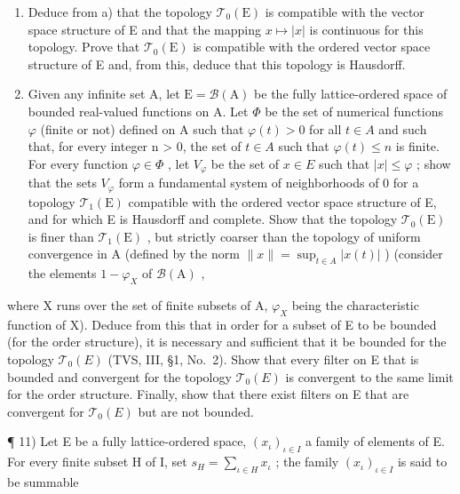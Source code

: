 \begin{enumerate}
\def\labelenumi{\alph{enumi})}
\setcounter{enumi}{1}
\item
  Deduce from a) that the topology \(\mathcal{T}_{0}(\mathrm{E})\) is compatible with the vector space structure of E and that the mapping \(x \mapsto |x|\) is continuous for this topology. Prove that \(\mathcal{T}_{0}(\mathrm{E})\) is compatible with the ordered vector space structure of E and, from this, deduce that this topology is Hausdorff.
\item
  Given any infinite set A, let \(\mathrm{E} = \mathcal{B}(\mathrm{A})\) be the fully lattice-ordered space of bounded real-valued functions on A. Let \(\Phi\) be the set of numerical functions \(\varphi\) (finite or not) defined on A such that \(\varphi(t) > 0\) for all \(t \in A\) and such that, for every integer n \textgreater{} 0, the set of \(t \in A\) such that \(\varphi(t) \leqslant n\) is finite. For every function \(\varphi \in \Phi\) , let \(V_{\varphi}\) be the set of \(x \in E\) such that \(|x| \leqslant \varphi\) ; show that the sets \(V_{\varphi}\) form a fundamental system of neighborhoods of 0 for a topology \(\mathcal{T}_{1}(\mathrm{E})\) compatible with the ordered vector space structure of E, and for which E is Hausdorff and complete. Show that the topology \(\mathcal{T}_{0}(\mathrm{E})\) is finer than \(\mathcal{T}_{1}(\mathrm{E})\) , but strictly coarser than the topology of uniform convergence in A (defined by the norm \(\|x\| = \sup_{t \in A} |x(t)|\) ) (consider the elements \(1 - \varphi_{X}\) of \(\mathcal{B}(\mathrm{A})\) ,
\end{enumerate}

where X runs over the set of finite subsets of A, \(\varphi_{X}\) being the characteristic function of X). Deduce from this that in order for a subset of E to be bounded (for the order structure), it is necessary and sufficient that it be bounded for the topology \(\mathcal{T}_{0}(E)\) (TVS, III, §1, No.~2). Show that every filter on E that is bounded and convergent for the topology \(\mathcal{T}_{0}(E)\) is convergent to the same limit for the order structure. Finally, show that there exist filters on E that are convergent for \(\mathcal{T}_{0}(E)\) but are not bounded.

¶ 11) Let E be a fully lattice-ordered space, \((x_{\iota})_{\iota \in I}\) a family of elements of E. For every finite subset H of I, set \(s_{H} = \sum_{\iota \in H} x_{\iota}\) ; the family \((x_{\iota})_{\iota \in I}\) is said to be summable

